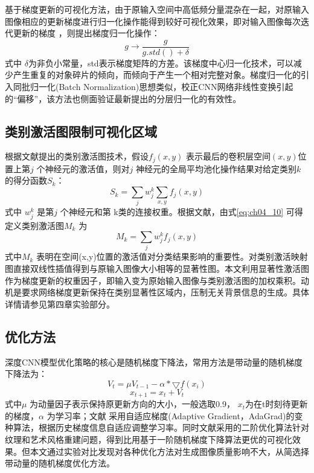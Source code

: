 	基于梯度更新的可视化方法，由于原输入空间中高低频分量混杂在一起，对原输入图像相应的更新梯度进行归一化操作能得到较好可视化效果，即对输入图像每次迭代更新的梯度 ，则提出梯度归一化操作：   
\begin{equation} \label{eq:ch04_09}
       g \rightarrow \frac{g}{g.std()+\delta}
\end{equation} 
式中 $\delta$为非负小常量，std表示梯度矩阵的方差。该梯度中心归一化技术，可以减少产生重复的对象碎片的倾向，而倾向于产生一个相对完整对象。梯度归一化的引入同批归一化(Batch Normalization)思想类似，校正CNN网络非线性变换引起的“偏移”，该方法也侧面验证最新提出的分层归一化\citep{Ioffe2014}的有效性。
\subsection{类别激活图限制可视化区域}
根据文献提出的类别激活图技术，假设$f_{j}(x,y)$  表示最后的卷积层空间$(x,y)$位置上第$j$ 个神经元的激活值，则对$j$ 神经元的全局平均池化操作结果对给定类别$k$的得分函数$S_{k}$：
\begin{equation} \label{eq:ch04_10}
      S_{k}=\sum _{j} w_{j}^{k} \sum _{x,y}f_{j}(x,y)
\end{equation}
式中 $w_{j}^{k}$ 是第$j$ 个神经元和第 k类的连接权重。根据文献，由式\ref{eq:ch04_10} 可得定义类别激活图$M_{k}$ 为	
\begin{equation} \label{eq:ch04_11}
      M_{k}=\sum _{j} w_{j}^{k}f_{j}(x,y)
\end{equation}
式中$M_{k}$ 表明在空间(x,y)位置的激活值对分类结果影响的重要性。对类别激活映射图直接双线性插值得到与原输入图像大小相等的显著性图。本文利用显著性激活图作为梯度更新的权重因子，即输入变为原始输入图像与类别激活图的加权乘积。动机是要求网络梯度更新保持在类别显著性区域内，压制无关背景信息的生成。具体详情请参见第四章实验部分。
\subsection{优化方法}

深度CNN模型优化策略的核心是随机梯度下降法，常用方法是带动量的随机梯度下降法为：
\begin{equation} \label{eq:ch04_12}
      V_{t}=\mu V_{t-1} -\alpha *\bigtriangledown {f(x_{i})}
\end{equation}          
\begin{equation} \label{eq:ch04_13}
     x_{t+1}=x_{t}+V_{t}
\end{equation}       
式中$\mu$ 为动量因子表示保持原更新方向的大小，一般选取0.9， $x_{t}$为在t时刻待更新的梯度，$\alpha$ 为学习率；文献\citep{Mahendran2015d,Mahendran2015} 采用自适应梯度(Adaptive Gradient，AdaGrad)\citep{Duchi2011}的变种算法，根据历史梯度信息自适应调整学习率。同时文献采用的二阶优化算法针对纹理和艺术风格重建问题，得到比用基于一阶随机梯度下降算法更优的可视化效果。但本文通过实验对比发现对各种优化方法对生成图像质量影响不大，从简选择带动量的随机梯度优化方法。
